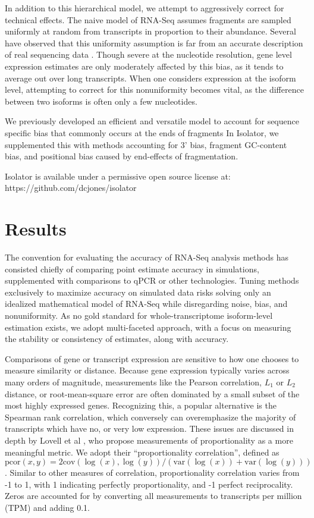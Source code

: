 \documentclass[twocolumn]{article}
\begin{document}
In addition to this hierarchical model, we attempt to aggressively correct for
technical effects. The naive model of RNA-Seq assumes fragments are sampled
uniformly at random from transcripts in proportion to their abundance. Several
have observed that this uniformity assumption is far from an accurate
description of real sequencing data \cite{Hansen:2010if}. Though severe at the
nucleotide resolution, gene level expression estimates are only moderately
affected by this bias, as it tends to average out over long transcripts. When
one considers expression at the isoform level, attempting to correct for this
nonuniformity becomes vital, as the difference between two isoforms is often
only a few nucleotides.

We previously developed an efficient and versatile model to account for sequence
specific bias that commonly occurs at the ends of fragments \cite{Jones:2012hg}
In Isolator, we supplemented this with methods accounting for 3' bias, fragment
GC-content bias, and positional bias caused by end-effects of fragmentation.

Isolator is available under a permissive open source license at:
https://github.com/dcjones/isolator

\section{Results}

The convention for evaluating the accuracy of RNA-Seq analysis methods has
consisted chiefly of comparing point estimate accuracy in simulations,
supplemented with comparisons to qPCR or other technologies. Tuning methods
exclusively to maximize accuracy on simulated data risks solving only an
idealized mathematical model of RNA-Seq while disregarding noise, bias, and
nonuniformity. As no gold standard for whole-transcriptome isoform-level
estimation exists, we adopt multi-faceted approach, with a focus on measuring
the stability or consistency of estimates, along with accuracy.

Comparisons of gene or transcript expression are sensitive to how one
chooses to measure similarity or distance. Because gene expression
typically varies across many orders of magnitude, measurements like
the Pearson correlation, $L_1$ or $L_2$ distance, or root-mean-square
error are often dominated by a small subset of the most highly expressed
genes. Recognizing this, a popular alternative is the Spearman rank
correlation, which conversely can overemphasize the majority of
transcripts which have no, or very low expression. These issues are
discussed in depth by Lovell et al \cite{Lovell:2015il}, who propose
measurements of proportionality as a more meaningful metric. We adopt
their ``proportionality correlation'', defined as
$\text{pcor}(x, y) = 2\text{cov}(\log(x), \log(y)) / (\text{var}(\log(x)) + \text{var}(\log(y)))$.
Similar to other measures of correlation, proportionality correlation
varies from -1 to 1, with 1 indicating perfectly proportionality, and -1
perfect reciprocality. Zeros are accounted for by converting all measurements to
transcripts per million (TPM) and adding 0.1.
\end{document}
